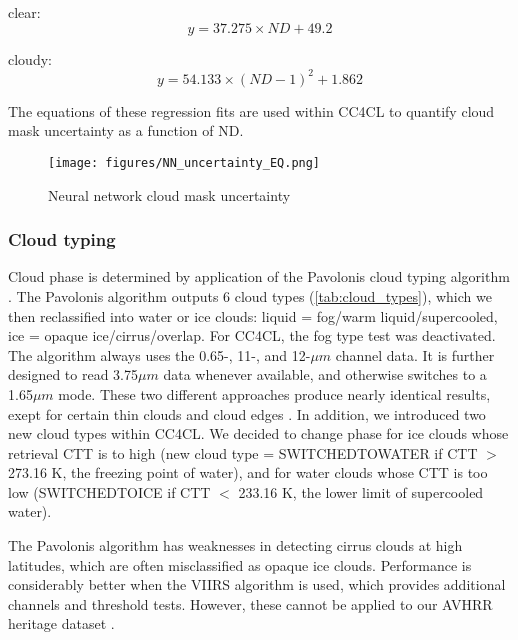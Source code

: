 clear:
\begin{equation}
  y = 37.275 \times ND + 49.2
\end{equation}

cloudy:
\begin{equation}
  y = 54.133 \times (ND-1)^2 + 1.862
\end{equation}

The equations of these regression fits are used within CC4CL to quantify cloud mask uncertainty as a function of ND.

\begin{figure}[h]
  \texttt{[image: figures/NN\_uncertainty\_EQ.png]}
  \caption{Neural network cloud mask uncertainty}
  \label{fig:NN_unc}
\end{figure}

\subsubsection{Cloud typing}\label{sec:Pavolonis}

Cloud phase is determined by application of the Pavolonis cloud typing algorithm \citep{Pavolonis05}. The Pavolonis algorithm outputs 6 cloud types (\cref{tab:cloud_types}), which we then reclassified into water or ice clouds: liquid = fog/warm liquid/supercooled, ice = opaque ice/cirrus/overlap. For CC4CL, the fog type test was deactivated. The algorithm always uses the 0.65-, 11-, and 12-$\mu m$ channel data. It is further designed to read 3.75$\mu m$ data whenever available, and otherwise switches to a 1.65$\mu m$ mode. These two different approaches produce nearly identical results, exept for certain thin clouds and cloud edges \citep{Pavolonis05}. In addition, we introduced two new cloud types within CC4CL. We decided to change phase for ice clouds whose retrieval CTT is to high (new cloud type = SWITCHED\textunderscore TO\textunderscore WATER if CTT $>$ 273.16 K, the freezing point of water), and for water clouds whose CTT is too low (SWITCHED\textunderscore TO\textunderscore ICE if CTT $<$ 233.16 K, the lower limit of supercooled water).

The Pavolonis algorithm has weaknesses in detecting cirrus clouds at high latitudes, which are often misclassified as opaque ice clouds. Performance is considerably better when the VIIRS algorithm is used, which provides additional channels and threshold tests. However, these cannot be applied to our AVHRR heritage dataset \citep{Pavolonis05}.

